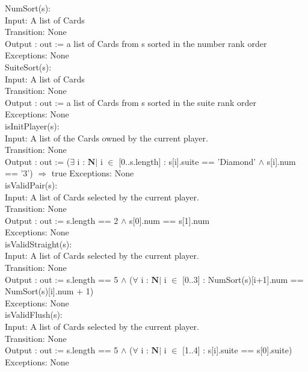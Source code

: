 \documentclass[12pt, titlepage]{article}
\begin{document}
\noindent NumSort(s):\\
Input: A list of Cards\\
Transition: None\\
Output : out := a list of Cards from s sorted in the number rank order\\
Exceptions: None\\

\noindent SuiteSort(s):\\
Input: A list of Cards\\
Transition: None\\
Output : out := a list of Cards from s sorted in the suite rank order\\
Exceptions: None\\

\noindent isInitPlayer(s):\\
Input: A list of the Cards owned by the current player.\\
Transition: None\\
Output : out := ($\exists$ i : $\mathbf{N} |$ i $\in$ [0..s.length] : s[i].suite == 'Diamond' $\land$ s[i].num == '3') $\Rightarrow$ true
Exceptions: None \\

\noindent isValidPair(s):\\
Input: A list of Cards selected by the current player.\\
Transition: None\\
Output : out := s.length == 2 $\land$ s[0].num == s[1].num\\
Exceptions: None\\

\noindent isValidStraight(s):\\
Input: A list of Cards selected by the current player.\\
Transition: None\\
Output : out := s.length == 5 $\land$ ($\forall$ i : $\mathbf{N} |$ i $\in$ [0..3] : NumSort(s)[i+1].num == NumSort(s)[i].num + 1) \\
Exceptions: None\\

\noindent isValidFlush(s):\\
Input: A list of Cards selected by the current player.\\
Transition: None\\
Output : out := s.length == 5 $\land$ ($\forall$ i : $\mathbf{N} |$ i $\in$ [1..4] : s[i].suite == s[0].suite) \\
Exceptions: None\\
\end{document}

